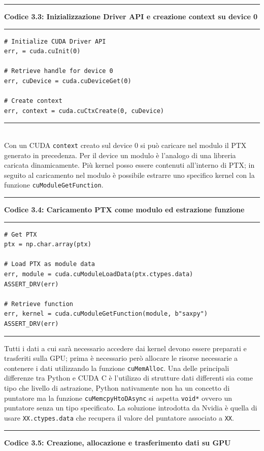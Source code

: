 \documentclass[12pt,a4paper]{report}
\begin{document}
\noindent\rule[0.5ex]{\linewidth}{2pt}
\small{\textbf{Codice 3.3: Inizializzazione Driver API e creazione context su device 0}} \\
\noindent\rule[0.5ex]{\linewidth}{1pt}
\begin{lstlisting}
# Initialize CUDA Driver API
err, = cuda.cuInit(0)

# Retrieve handle for device 0
err, cuDevice = cuda.cuDeviceGet(0)

# Create context
err, context = cuda.cuCtxCreate(0, cuDevice)
\end{lstlisting}
\noindent\rule[0.5ex]{\linewidth}{1pt} \\[10pt]
Con un CUDA \verb|context| creato sul device 0 si può caricare nel modulo il PTX generato in precedenza. Per il device un modulo è l'analogo di una libreria caricata dinamicamente. Più kernel posso essere contenuti all'interno di PTX; in seguito al caricamento nel modulo è possibile estrarre uno specifico kernel con la funzione \verb|cuModuleGetFunction|. \\[10pt]
\noindent\rule[0.5ex]{\linewidth}{2pt}
\small{\textbf{Codice 3.4: Caricamento PTX come modulo ed estrazione funzione}} \\
\noindent\rule[0.5ex]{\linewidth}{1pt}
\begin{lstlisting}
# Get PTX
ptx = np.char.array(ptx)

# Load PTX as module data
err, module = cuda.cuModuleLoadData(ptx.ctypes.data)
ASSERT_DRV(err)

# Retrieve function
err, kernel = cuda.cuModuleGetFunction(module, b"saxpy")
ASSERT_DRV(err)
\end{lstlisting}
\noindent\rule[0.5ex]{\linewidth}{1pt} \newpage
Tutti i dati a cui sarà necessario accedere dai kernel devono essere preparati e trasferiti sulla GPU; prima è necessario però allocare le risorse necessarie a contenere i dati utilizzando la funzione \verb|cuMemAlloc|. \newline
Una delle principali differenze tra Python e CUDA C è l'utilizzo di strutture dati differenti sia come tipo che livello di astrazione, Python nativamente non ha un concetto di puntatore ma la funzione \verb|cuMemcpyHtoDAsync| si aspetta \verb|void*| ovvero un puntatore senza un tipo specificato. La soluzione introdotta da Nvidia è quella di usare \verb|XX.ctypes.data| che recupera il valore del puntatore associato a \verb|XX|. \\[10pt]
\noindent\rule[0.5ex]{\linewidth}{2pt}
\small{\textbf{Codice 3.5: Creazione, allocazione e trasferimento dati su GPU}} \\
\end{document}
